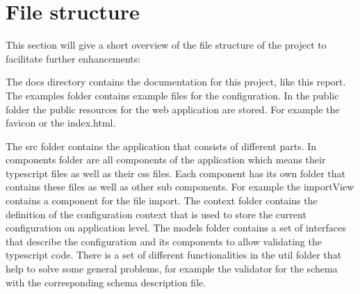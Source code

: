 \newpage

\section{File structure}
This section will give a short overview of the file structure of the project to facilitate further enhancements:

\hfill

The docs directory contains the documentation for this project, like this report. The examples folder contains example files for the configuration. In the public folder the public resources for the web application are stored. For example the favicon or the index.html.

The src folder contains the application that consists of different parts. In components folder are all components of the application which means their typescript files as well as their css files. Each component has its own folder that contains these files as well as other sub components. For example the importView contains a component for the file import. The context folder contains the definition of the configuration context that is used to store the current configuration on application level. The models folder contains a set of interfaces that describe the configuration and its components to allow validating the typescript code. There is a set of different functionalities in the util folder that help to solve some general problems, for example the validator for the schema with the corresponding schema description file.

\clearpage